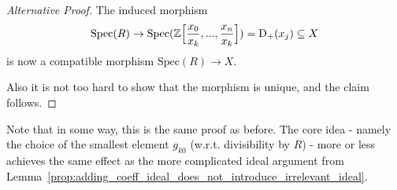 \documentclass{scrartcl}
\newcommand{\Z}{\mathbb{Z}}
\newcommand{\D}[1]{\mathrm{D}_+(#1)}
\newcommand{\Spec}{\mathrm{Spec}}
\theoremstyle{definition}
\begin{document}
\begin{proof}[Alternative Proof]
    The induced morphism
    \begin{equation*}
        \Spec(R) \to \Spec(\Z\Bigl[ \frac {x_0} {x_k}, ..., \frac {x_n} {x_k} \Bigr]) = \D{x_j} \subseteq X
    \end{equation*}
    is now a compatible morphism $\Spec(R) \to X$.
    
    Also it is not too hard to show that the morphism is unique, and the claim follows.
\end{proof}
Note that in some way, this is the same proof as before.
The core idea - namely the choice of the smallest element $g_{k0}$ (w.r.t. divisibility by $R$) - more or less achieves the same effect as the more complicated ideal argument from Lemma~\ref{prop:adding_coeff_ideal_does_not_introduce_irrelevant_ideal}.
\printbibliography
\end{document}
